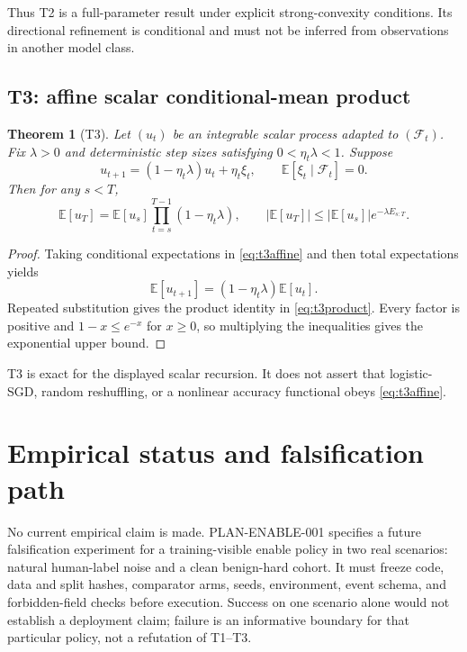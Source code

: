 \documentclass{article}
\newtheorem{theorem}{Theorem}
\begin{document}
Thus T2 is a full-parameter result under explicit strong-convexity conditions.
Its directional refinement is conditional and must not be inferred from
observations in another model class.

\subsection{T3: affine scalar conditional-mean product}
\label{sec:t3}

\begin{theorem}[T3]
\label{thm:t3}
Let $(u_t)$ be an integrable scalar process adapted to
$(\mathcal F_t)$. Fix $\lambda>0$ and deterministic step sizes satisfying
$0<\eta_t\lambda<1$. Suppose
\begin{equation}
 u_{t+1}=(1-\eta_t\lambda)u_t+\eta_t\xi_t,\qquad
 \mathbb E[\xi_t\mid\mathcal F_t]=0.
\label{eq:t3affine}
\end{equation}
Then for any $s<T$,
\begin{equation}
 \mathbb E[u_T]=\mathbb E[u_s]\prod_{t=s}^{T-1}
 (1-\eta_t\lambda),\qquad
 |\mathbb E[u_T]|
 \leq|\mathbb E[u_s]|e^{-\lambda E_{s:T}}.
\label{eq:t3product}
\end{equation}
\end{theorem}

\begin{proof}
Taking conditional expectations in \eqref{eq:t3affine} and then total
expectations yields
\[
 \mathbb E[u_{t+1}]=(1-\eta_t\lambda)\mathbb E[u_t].
\]
Repeated substitution gives the product identity in \eqref{eq:t3product}.
Every factor is positive and $1-x\leq e^{-x}$ for $x\geq0$, so multiplying
the inequalities gives the exponential upper bound.
\end{proof}

T3 is exact for the displayed scalar recursion. It does not assert that
logistic-SGD, random reshuffling, or a nonlinear accuracy functional obeys
\eqref{eq:t3affine}.

\section{Empirical status and falsification path}
\label{sec:empirical-status}

No current empirical claim is made. PLAN-ENABLE-001 specifies a future
falsification experiment for a training-visible enable policy in two real
scenarios: natural human-label noise and a clean benign-hard cohort. It must
freeze code, data and split hashes, comparator arms, seeds, environment,
event schema, and forbidden-field checks before execution. Success on one
scenario alone would not establish a deployment claim; failure is an
informative boundary for that particular policy, not a refutation of T1--T3.
\end{document}
